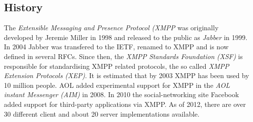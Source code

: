 \subsection{History}
The \textit{Extensible Messaging and Presence Protocol (XMPP}
was originally developed by Jeremie Miller in 1998 and released
to the public as \textit{Jabber} in 1999. In 2004 Jabber
was transfered to the IETF, renamed to XMPP
and is now defined in several
RFCs.\cite{rfc3920,rfc3921,rfc3922,rfc3923,rfc4622,rfc4854,rfc4979,rfc6120,rfc6121}
Since then, the \textit{XMPP Standards Foundation (XSF)} is responsible
for standardising XMPP related protocols, the so called 
\textit{XMPP Extension Protocols (XEP)}.
It is estimated that by 2003 XMPP has been used by 10 million people.\cite{xmppuser}
AOL added experimental support for XMPP in the 
\textit{AOL instant Messenger (AIM)} in 2008.
In 2010 the social-networking site Facebook added support for
third-party applications via XMPP.
As of 2012, there are over 30 different client and about 20
server implementations available.

